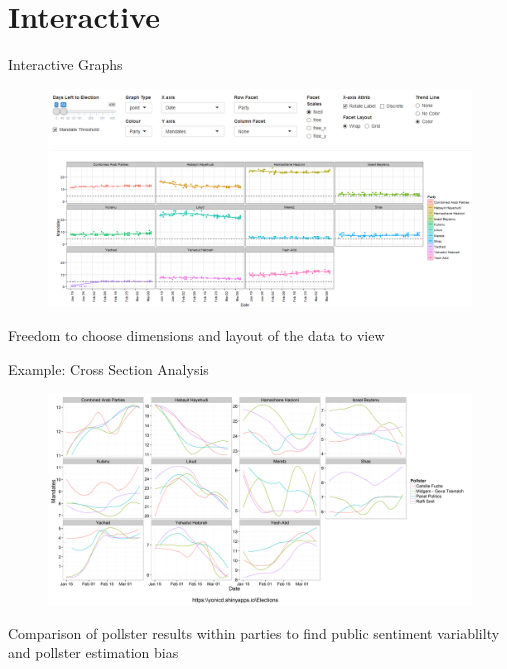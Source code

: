 \documentclass[11pt]{beamer}
\begin{document}
\section{Interactive}
\begin{frame}{Interactive Graphs}
				\begin{figure}[h]
					\centering
					\includegraphics[width=1\linewidth]{../www/pad_screen_grab}
					\label{fig:pad_screen_grab}
				\end{figure}
\begin{block}{Freedom to choose dimensions and layout of the data to view}
\end{block}
\end{frame}

\begin{frame}{Example: Cross Section Analysis}
				\begin{figure}[h]
					\centering
					\includegraphics[width=1\linewidth]{../www/ElectionPlot_trend}
					\label{fig:ElectionPlot_trend}
				\end{figure}
\begin{block}{Comparison of pollster results within parties to find public sentiment variablilty and pollster estimation bias}
\end{block}				
\end{frame}				
\end{document}
